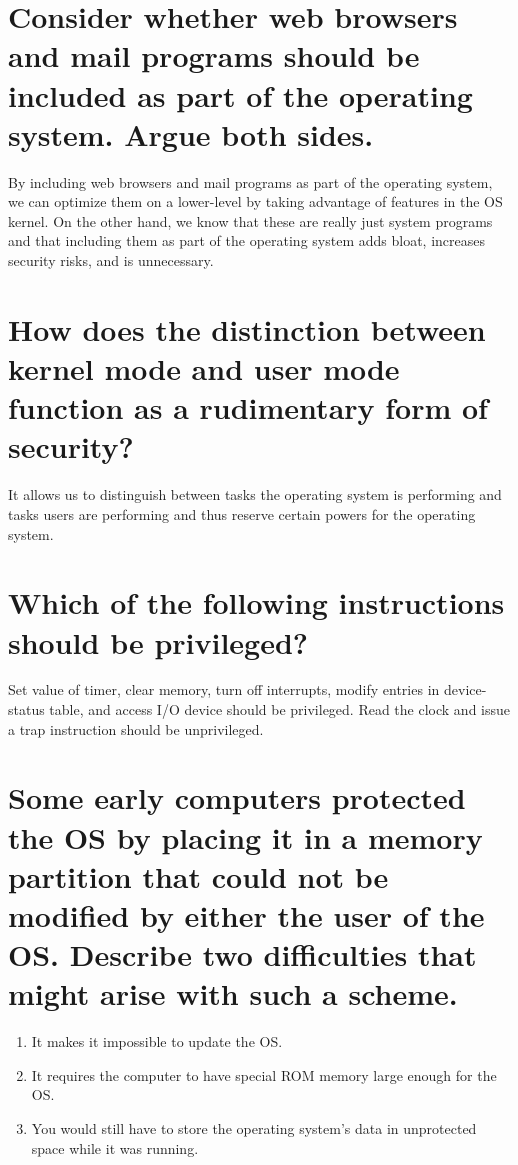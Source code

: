 \documentclass{book}%
\begin{document}
\section{Consider whether web browsers and mail programs should be included as part of the operating system. Argue both sides.}
By including web browsers and mail programs as part of the operating system, we can optimize them on a lower-level by taking advantage of features in the OS kernel. On the other hand, we know that these are really just system programs and that including them as part of the operating system adds bloat, increases security risks, and is unnecessary. 
\section{How does the distinction between kernel mode and user mode function as a rudimentary form of security?}
It allows us to distinguish between tasks the operating system is performing and tasks users are performing and thus reserve certain powers for the operating system.
\section{Which of the following instructions should be privileged?}
Set value of timer, clear memory, turn off interrupts, modify entries in device-status table, and access I/O device should be privileged. Read the clock and issue a trap instruction should be unprivileged.
\section{Some early computers protected the OS by placing it in a memory partition that could not be modified by either the user of the OS. Describe two difficulties that might arise with such a scheme.}
\begin{enumerate}
\item It makes it impossible to update the OS.
\item It requires the computer to have special ROM memory large enough for the OS.
\item You would still have to store the operating system's data in unprotected space while it was running.
\end{enumerate}
\end{document}
